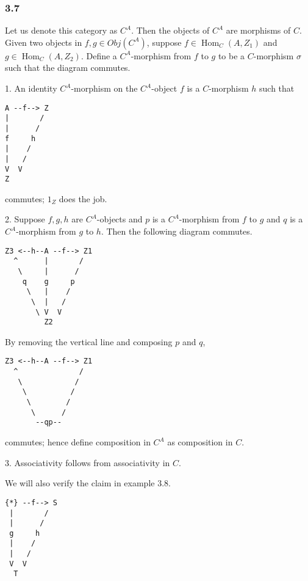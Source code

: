 \documentclass{article}
\DeclareMathOperator{\Hom}{Hom}
\begin{document}
\subsubsection*{3.7}

Let us denote this category as $C^A$. Then the objects of $C^A$ are morphisms of $C$. Given two objects in $f, g \in Obj(C^A)$, suppose $f \in \Hom_C(A, Z_1)$ and $g \in \Hom_C(A, Z_2)$. Define a $C^A$-morphism from $f$ to $g$ to be a $C$-morphism $\sigma$ such that the diagram commutes.


1. An identity $C^A$-morphism on the $C^A$-object $f$ is a $C$-morphism $h$ such that

\begin{verbatim}
A --f--> Z
|       /
|      /
f     h
|    /
|   /
V  V
Z
\end{verbatim}

commutes; $1_Z$ does the job.

2. Suppose $f, g, h$ are $C^A$-objects and $p$ is a $C^A$-morphism from $f$ to $g$ and $q$ is a $C^A$-morphism from $g$ to $h$. Then the following diagram commutes.

\begin{verbatim}
Z3 <--h--A --f--> Z1
  ^      |       /
   \     |      /
    q    g     p
     \   |    /
      \  |   /
       \ V  V
         Z2
\end{verbatim}

By removing the vertical line and composing $p$ and $q$,

\begin{verbatim}
Z3 <--h--A --f--> Z1
  ^              /
   \            /
    \          /
     \        /
      \      /
       --qp--
\end{verbatim}

commutes; hence define composition in $C^A$ as composition in $C$.

3. Associativity follows from associativity in $C$.

We will also verify the claim in example 3.8.

\begin{verbatim}
{*} --f--> S
 |       /
 |      /
 g     h
 |    /
 |   /
 V  V
  T
\end{verbatim}
\end{document}
